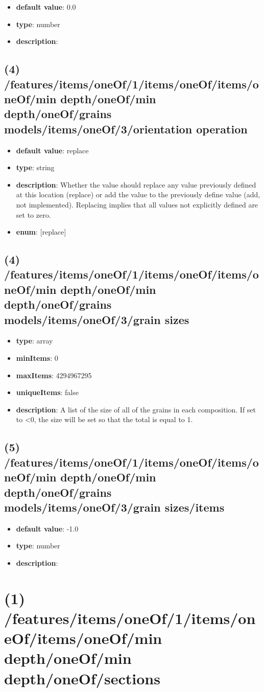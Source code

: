 \begin{itemize}[leftmargin=6em]\item {\bf default value}: 0.0
\item {\bf type}: number
\item {\bf description}: 
\end{itemize}\subsection{(4) /features/items/oneOf/1/items/oneOf/items/oneOf/min depth/oneOf/min depth/oneOf/grains models/items/oneOf/3/orientation operation}
\begin{itemize}[leftmargin=4em]\item {\bf default value}: replace
\item {\bf type}: string
\item {\bf description}: Whether the value should replace any value previously defined at this location (replace) or add the value to the previously define value (add, not implemented). Replacing implies that all values not explicitly defined are set to zero.
\item {\bf enum}: [replace]\end{itemize}\subsection{(4) /features/items/oneOf/1/items/oneOf/items/oneOf/min depth/oneOf/min depth/oneOf/grains models/items/oneOf/3/grain sizes}
\begin{itemize}[leftmargin=4em]\item {\bf type}: array
\item {\bf minItems}: 0
\item {\bf maxItems}: 4294967295
\item {\bf uniqueItems}: false
\item {\bf description}: A list of the size of all of the grains in each composition. If set to <0, the size will be set so that the total is equal to 1.
\end{itemize}\subsection{(5) /features/items/oneOf/1/items/oneOf/items/oneOf/min depth/oneOf/min depth/oneOf/grains models/items/oneOf/3/grain sizes/items}
\begin{itemize}[leftmargin=5em]\item {\bf default value}: -1.0
\item {\bf type}: number
\item {\bf description}: 
\end{itemize}\section{(1) /features/items/oneOf/1/items/oneOf/items/oneOf/min depth/oneOf/min depth/oneOf/sections}
